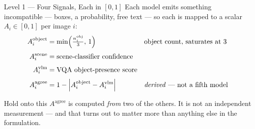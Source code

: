 \documentclass[aspectratio=169,11pt]{beamer}
\begin{document}
\begin{frame}{Level 1 --- Four Signals, Each in $[0,1]$}
\small
Each model emits something incompatible --- boxes, a probability, free text --- so each is mapped to a scalar $A_i \in [0,1]$ per image $i$:
\vspace{1mm}
\begin{align*}
A_i^{\text{object}} &= \min\!\left(\tfrac{n_i^{\text{obj}}}{3},\,1\right) && \text{object count, saturates at } 3 \\[1mm]
A_i^{\text{scene}} &= \text{scene-classifier confidence} && \\[1mm]
A_i^{\text{vlm}} &= \text{VQA object-presence score} && \\[1mm]
A_i^{\text{agree}} &= 1 - \left|A_i^{\text{object}} - A_i^{\text{vlm}}\right| && \text{\emph{derived} --- not a fifth model}
\end{align*}
\vspace{1mm}
\begin{alertblock}{\small Hold onto this}
\footnotesize $A^{\text{agree}}$ is computed \emph{from} two of the others. It is not an independent measurement --- and that turns out to matter more than anything else in the formulation.
\end{alertblock}
\end{frame}
\end{document}
